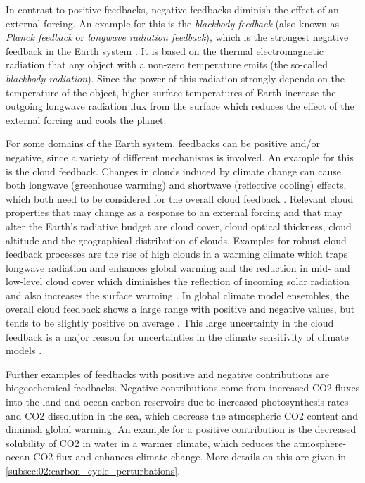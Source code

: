 In contrast to positive feedbacks, negative feedbacks diminish the effect of an
external forcing. An example for this is the \emph{blackbody feedback} (also
known as \emph{Planck feedback} or \emph{longwave radiation feedback}), which
is the strongest negative feedback in the Earth system \autocite{Cubasch2013}.
It is based on the thermal electromagnetic radiation that any object with a
non-zero temperature emits (the so-called \emph{blackbody radiation}). Since
the power of this radiation strongly depends on the temperature of the object,
higher surface temperatures of Earth increase the outgoing longwave radiation
flux from the surface which reduces the effect of the external forcing and
cools the planet.

For some domains of the Earth system, feedbacks can be positive and/or
negative, since a variety of different mechanisms is involved. An example for
this is the cloud feedback. Changes in clouds induced by climate change can
cause both longwave (greenhouse warming) and shortwave (reflective cooling)
effects, which both need to be considered for the overall cloud feedback
\autocite{Boucher2013}. Relevant cloud properties that may change as a response
to an external forcing and that may alter the Earth's radiative budget are
cloud cover, cloud optical thickness, cloud altitude and the geographical
distribution of clouds. Examples for robust cloud feedback processes are the
rise of high clouds in a warming climate which traps longwave radiation and
enhances global warming and the reduction in mid- and low-level cloud cover
which diminishes the reflection of incoming solar radiation and also increases
the surface warming \autocite{Boucher2013}. In global climate model ensembles,
the overall cloud feedback shows a large range with positive and negative
values, but tends to be slightly positive on average \autocite{Soden2006,
  Dufresne2008, Vial2013, Zelinka2020}. This large uncertainty in the cloud
feedback is a major reason for uncertainties in the climate sensitivity of
climate models \autocite{Boucher2013, Flato2013}.

Further examples of feedbacks with positive and negative contributions are
biogeochemical feedbacks. Negative contributions come from increased \ac{CO2}
fluxes into the land and ocean carbon reservoirs due to increased
photosynthesis rates and \ac{CO2} dissolution in the sea, which decrease the
atmospheric \ac{CO2} content and diminish global warming. An example for a
positive contribution is the decreased solubility of \ac{CO2} in water in a
warmer climate, which reduces the atmosphere-ocean \ac{CO2} flux and enhances
climate change. More details on this are given in
\cref{subsec:02:carbon_cycle_perturbations}.


